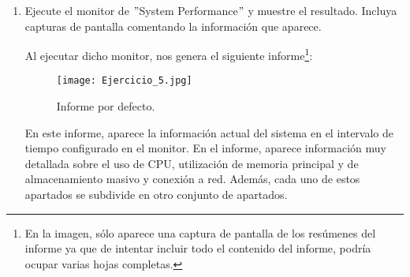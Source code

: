 \documentclass[paper=a4, fontsize=11pt]{scrartcl} %
\numberwithin{equation}{section} %
\numberwithin{figure}{section} %
\numberwithin{table}{section} %
\begin{document}
\begin{enumerate}
		\begin{itemize}
			\item En rojo, las conexiones del móvil, nos muestra algunos datos del mismo como su número
			de serie.
			
			\item En amarillo, las desconexiones del móvil\footnote{De hecho, la desconexión que aparece,
			no es cosa mía, al parecer, el cable está un poco roto y se desconecta antes de que lo
			desenchufe, ya que lo desenchufé junto con el pendrive.}.
			
			\item En azul, las conexiones del pendrive, también nos muestra el número de serie, y además,
			se ve cómo se abre la carpeta cuando lo conectamos.
			
			\item En verde, las desconexiones del pendrive\footnote{Nótese, que no hay diferencia con
			las del móvil.}.
		\end{itemize}
		
	\subsection{Monitor General \textit{gnome-system-monitor}}
	\section{Monitorizando Windows: \textit{perfmon}}
		\item Ejecute el monitor de $"$System Performance$"$ y muestre el resultado. Incluya capturas
		de pantalla comentando la información que aparece.
		
		Al ejecutar dicho monitor, nos genera el siguiente informe\footnote{En la imagen, sólo aparece
		una captura de pantalla de los resúmenes del informe ya que de intentar incluir todo el
		contenido del informe, podría ocupar varias hojas completas.}:
		
		\begin{figure}[H]
			\centering
			\texttt{[image: Ejercicio\_5.jpg]}
			\caption{Informe por defecto.}
			\label{fig:SP_default}
		\end{figure}
		
		En este informe, aparece la información actual del sistema en el intervalo de tiempo configurado
		en el monitor. En el informe, aparece información muy detallada sobre el uso de CPU, utilización
		de memoria principal y de almacenamiento masivo y conexión a red. Además, cada uno de estos
		apartados se subdivide en otro conjunto de apartados.
		

\end{enumerate}
\end{document}

